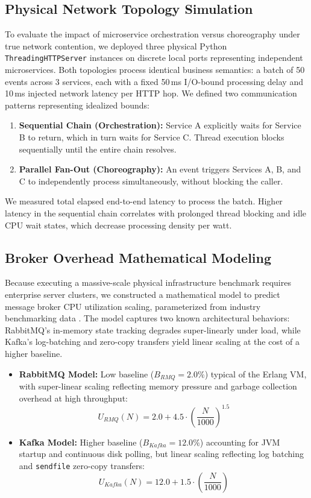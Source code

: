 \documentclass[conference]{IEEEtran}
\begin{document}
\subsection{Physical Network Topology Simulation}
To evaluate the impact of microservice orchestration versus choreography under true network contention, we deployed three physical Python \texttt{ThreadingHTTPServer} instances on discrete local ports representing independent microservices. Both topologies process identical business semantics: a batch of 50 events across 3 services, each with a fixed 50\,ms I/O-bound processing delay and 10\,ms injected network latency per HTTP hop. We defined two communication patterns representing idealized bounds:

\begin{enumerate}
    \item \textbf{Sequential Chain (Orchestration):} Service A explicitly waits for Service B to return, which in turn waits for Service C. Thread execution blocks sequentially until the entire chain resolves.
    \item \textbf{Parallel Fan-Out (Choreography):} An event triggers Services A, B, and C to independently process simultaneously, without blocking the caller.
\end{enumerate}

We measured total elapsed end-to-end latency to process the batch. Higher latency in the sequential chain correlates with prolonged thread blocking and idle CPU wait states, which decrease processing density per watt.

\subsection{Broker Overhead Mathematical Modeling}
Because executing a massive-scale physical infrastructure benchmark requires enterprise server clusters, we constructed a mathematical model to predict message broker CPU utilization scaling, parameterized from industry benchmarking data \cite{b5}. The model captures two known architectural behaviors: RabbitMQ's in-memory state tracking degrades super-linearly under load, while Kafka's log-batching and zero-copy transfers yield linear scaling at the cost of a higher baseline.

\begin{itemize}
    \item \textbf{RabbitMQ Model:} Low baseline ($B_{RMQ} = 2.0\%$) typical of the Erlang VM, with super-linear scaling reflecting memory pressure and garbage collection overhead at high throughput:
    \begin{equation}
        U_{RMQ}(N) = 2.0 + 4.5 \cdot \left(\frac{N}{1000}\right)^{1.5}
    \end{equation}
    \item \textbf{Kafka Model:} Higher baseline ($B_{Kafka} = 12.0\%$) accounting for JVM startup and continuous disk polling, but linear scaling reflecting log batching and \texttt{sendfile} zero-copy transfers:
    \begin{equation}
        U_{Kafka}(N) = 12.0 + 1.5 \cdot \left(\frac{N}{1000}\right)
    \end{equation}
\end{itemize}
\end{document}
